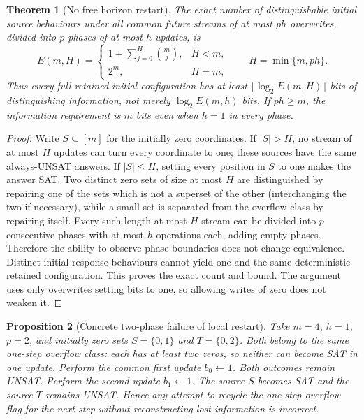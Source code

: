 \documentclass[11pt]{article}
\newtheorem{theorem}{Theorem}
\newtheorem{proposition}[theorem]{Proposition}
\begin{document}
\begin{theorem}[No free horizon restart]\label{thm:stage}
The exact number of distinguishable initial source behaviours under all common future streams of at most $ph$ overwrites, divided into $p$ phases of at most $h$ updates, is
\[
\boxed{E(m,H)=\begin{cases}
1+\displaystyle\sum_{j=0}^{H}\binom mj,&H<m,\\
2^m,&H=m,
\end{cases}\qquad H=\min\{m,ph\}.}
\]
Thus every full retained initial configuration has at least $\lceil\log_2 E(m,H)\rceil$ bits of distinguishing information, \emph{not} merely $\log_2 E(m,h)$ bits. If $ph\ge m$, the information requirement is $m$ bits even when $h=1$ in every phase.
\end{theorem}
\begin{proof}
Write $S\subseteq[m]$ for the initially zero coordinates. If $|S|>H$, no stream of at most $H$ updates can turn every coordinate to one; these sources have the same always-UNSAT answers. If $|S|\le H$, setting every position in $S$ to one makes the answer SAT. Two distinct zero sets of size at most $H$ are distinguished by repairing one of the sets which is not a superset of the other (interchanging the two if necessary), while a small set is separated from the overflow class by repairing itself. Every such length-at-most-$H$ stream can be divided into $p$ consecutive phases with at most $h$ operations each, adding empty phases. Therefore the ability to observe phase boundaries does not change equivalence. Distinct initial response behaviours cannot yield one and the same deterministic retained configuration. This proves the exact count and bound. The argument uses only overwrites setting bits to one, so allowing writes of zero does not weaken it.
\end{proof}

\begin{proposition}[Concrete two-phase failure of local restart]\label{prop:two}
Take $m=4$, $h=1$, $p=2$, and initially zero sets $S=\{0,1\}$ and $T=\{0,2\}$. Both belong to the same one-step overflow class: each has at least two zeros, so neither can become SAT in one update. Perform the common first update $b_0\gets1$. Both outcomes remain UNSAT. Perform the second update $b_1\gets1$. The source $S$ becomes SAT and the source $T$ remains UNSAT. Hence any attempt to recycle the one-step overflow flag for the next step without reconstructing lost information is incorrect.
\end{proposition}
\end{document}
